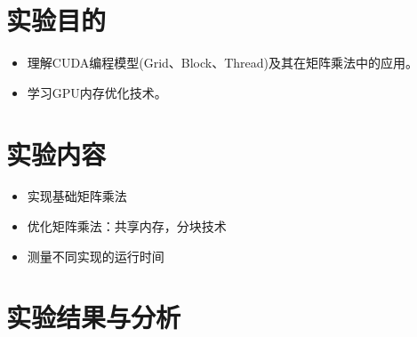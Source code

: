 \documentclass{SYSUReport}
\date{\today}
\begin{document}
\cover
\thispagestyle{empty} %
\clearpage



\section{实验目的}
\begin{itemize}
    \item 理解CUDA编程模型(Grid、Block、Thread)及其在矩阵乘法中的应用。
    \item 学习GPU内存优化技术。
\end{itemize}
\section{实验内容}
\begin{itemize}
    \item 实现基础矩阵乘法
\item 优化矩阵乘法：共享内存，分块技术
\item 测量不同实现的运行时间
\end{itemize}
\section{实验结果与分析}
\end{document}
